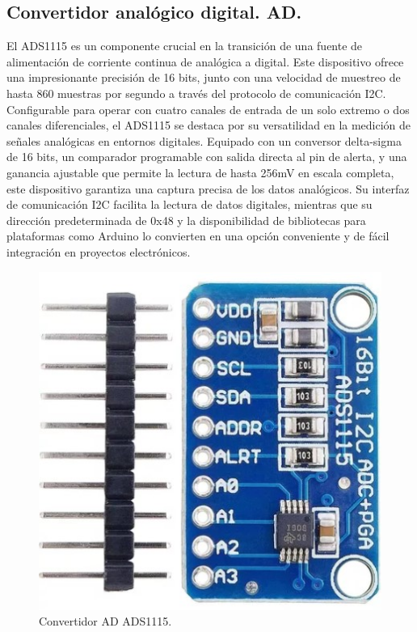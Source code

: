 \subsection{Convertidor analógico digital. AD.}
El ADS1115 es un componente crucial en la transición de una fuente de alimentación de corriente continua de analógica a digital. Este dispositivo ofrece una impresionante precisión de 16 bits, junto con una velocidad de muestreo de hasta 860 muestras por segundo a través del protocolo de comunicación I2C. Configurable para operar con cuatro canales de entrada de un solo extremo o dos canales diferenciales, el ADS1115 se destaca por su versatilidad en la medición de señales analógicas en entornos digitales. 
Equipado con un conversor delta-sigma de 16 bits, un comparador programable con salida directa al pin de alerta, y una ganancia ajustable que permite la lectura de hasta 256mV en escala completa, este dispositivo garantiza una captura precisa de los datos analógicos. Su interfaz de comunicación I2C facilita la lectura de datos digitales, mientras que su dirección predeterminada de 0x48 y la disponibilidad de bibliotecas para plataformas como Arduino lo convierten en una opción conveniente y de fácil integración en proyectos electrónicos.
\begin{figure}[H]
    \centering
    \includegraphics[scale=0.1]{./imagenes/ads1115.jpg}
    \caption{Convertidor AD ADS1115.}
    \label{F:ADC}
\end{figure}

